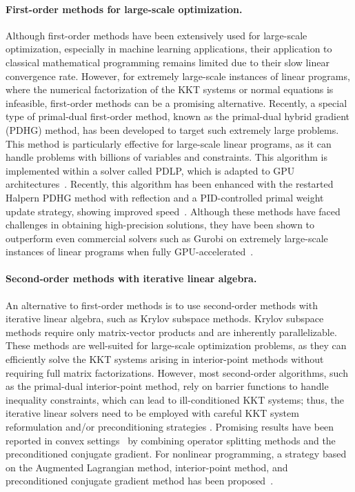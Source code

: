 \paragraph{First-order methods for large-scale optimization.}
Although first-order methods have been extensively used for large-scale optimization, especially in machine learning applications, their application to classical mathematical programming remains limited due to their slow linear convergence rate.
However, for extremely large-scale instances of linear programs, where the numerical factorization of the KKT systems or normal equations is infeasible, first-order methods can be a promising alternative.
Recently, a special type of primal-dual first-order method, known as the primal-dual hybrid gradient (PDHG) method, has been developed to target such extremely large problems.
This method is particularly effective for large-scale linear programs, as it can handle problems with billions of variables and constraints.
This algorithm is implemented within a solver called PDLP, which is adapted to GPU architectures~\cite{lu2023cupdlp,lu2023cupdlp2}.
Recently, this algorithm has been enhanced with the restarted Halpern PDHG method with reflection and a PID-controlled primal weight update strategy, showing improved speed~\cite{luCuPDLPFurtherEnhanced2025}.
Although these methods have faced challenges in obtaining high-precision solutions, they have been shown to outperform even commercial solvers such as Gurobi on extremely large-scale instances of linear programs when fully GPU-accelerated~\cite{lu2023cupdlp,lu2023cupdlp2}.

\paragraph{Second-order methods with iterative linear algebra.}
An alternative to first-order methods is to use second-order methods with iterative linear algebra, such as Krylov subspace methods.
Krylov subspace methods require only matrix-vector products and are inherently parallelizable.
These methods are well-suited for large-scale optimization problems, as they can efficiently solve the KKT systems arising in interior-point methods without requiring full matrix factorizations.
However, most second-order algorithms, such as the primal-dual interior-point method, rely on barrier functions to handle inequality constraints, which can lead to ill-conditioned KKT systems; thus, the iterative linear solvers need to be employed with careful KKT system reformulation and/or preconditioning strategies \cite{curtisNoteImplementationInteriorpoint2012,rodriguezScalablePreconditioningBlockstructured2020}.
Promising results have been reported in convex settings~\cite{schubigerGPUAccelerationADMM2020} by combining operator splitting methods and the preconditioned conjugate gradient.
For nonlinear programming, a strategy based on the Augmented Lagrangian method, interior-point method, and preconditioned conjugate gradient method has been proposed~\cite{cao2016augmented}.

